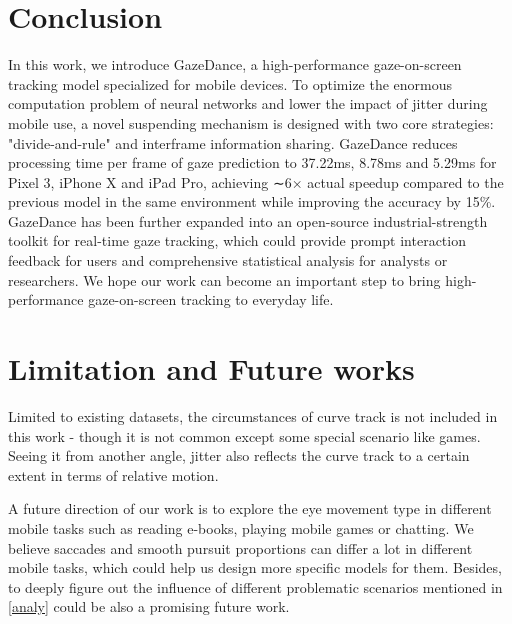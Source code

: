 \documentclass[acmlarge]{acmart}
\begin{document}


\section{Conclusion}
In this work, we introduce GazeDance, a high-performance gaze-on-screen tracking model specialized for mobile devices. To optimize the enormous computation problem of neural networks and lower the impact of jitter during mobile use, a novel suspending mechanism is designed with two core strategies: "divide-and-rule" and interframe information sharing. GazeDance reduces processing time per frame of gaze prediction to 37.22ms, 8.78ms and 5.29ms for Pixel 3, iPhone X and iPad Pro, achieving ∼6× actual speedup compared to the previous model in the same environment while improving the accuracy by 15\%. GazeDance has been further expanded into an open-source industrial-strength toolkit for real-time gaze tracking, which could provide prompt interaction feedback for users and comprehensive statistical analysis for analysts or researchers. We hope our work can become an important step to bring high-performance gaze-on-screen tracking to everyday life.

\section{Limitation and Future works}
Limited to existing datasets, the circumstances of curve track is not included in this work - though it is not common except some special scenario like games. Seeing it from another angle, jitter also reflects the curve track to a certain extent in terms of relative motion.

A future direction of our work is to explore the eye movement type in different mobile tasks such as reading e-books, playing mobile games or chatting. We believe saccades and smooth pursuit proportions can differ a lot in different mobile tasks, which could help us design more specific models for them. Besides, to deeply figure out the influence of different problematic scenarios mentioned in \ref{analy} could be also a promising future work. 







\end{document}

